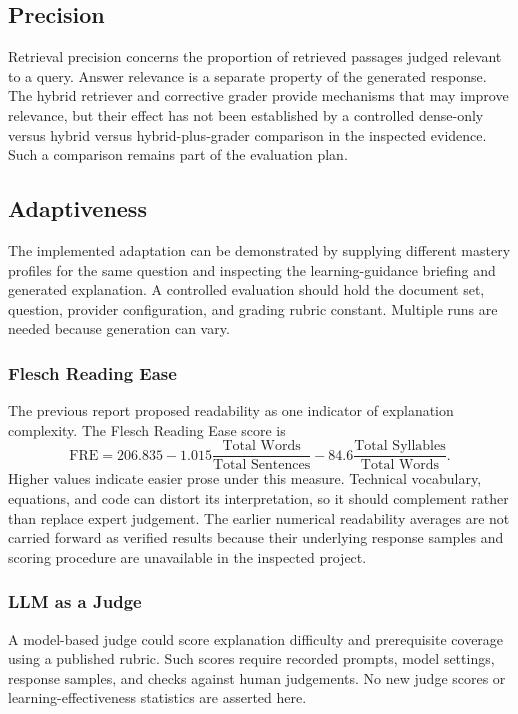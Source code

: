 \documentclass[11pt, a4paper, oneside]{report}
\begin{document}
\subsection{Precision}
Retrieval precision concerns the proportion of retrieved passages judged relevant to a query. Answer relevance is a separate property of the generated response. The hybrid retriever and corrective grader provide mechanisms that may improve relevance, but their effect has not been established by a controlled dense-only versus hybrid versus hybrid-plus-grader comparison in the inspected evidence. Such a comparison remains part of the evaluation plan.

\subsection{Adaptiveness}
\label{sec:adaptiveness}
The implemented adaptation can be demonstrated by supplying different mastery profiles for the same question and inspecting the learning-guidance briefing and generated explanation. A controlled evaluation should hold the document set, question, provider configuration, and grading rubric constant. Multiple runs are needed because generation can vary.

\subsubsection{Flesch Reading Ease}
The previous report proposed readability as one indicator of explanation complexity. The Flesch Reading Ease score is
\begin{equation}
  \text{FRE}=206.835-1.015\frac{\text{Total Words}}{\text{Total Sentences}}
  -84.6\frac{\text{Total Syllables}}{\text{Total Words}}.
  \label{eq:fre}
\end{equation}
Higher values indicate easier prose under this measure. Technical vocabulary, equations, and code can distort its interpretation, so it should complement rather than replace expert judgement. The earlier numerical readability averages are not carried forward as verified results because their underlying response samples and scoring procedure are unavailable in the inspected project.

\subsubsection{LLM as a Judge}
A model-based judge could score explanation difficulty and prerequisite coverage using a published rubric. Such scores require recorded prompts, model settings, response samples, and checks against human judgements. No new judge scores or learning-effectiveness statistics are asserted here.
\end{document}
